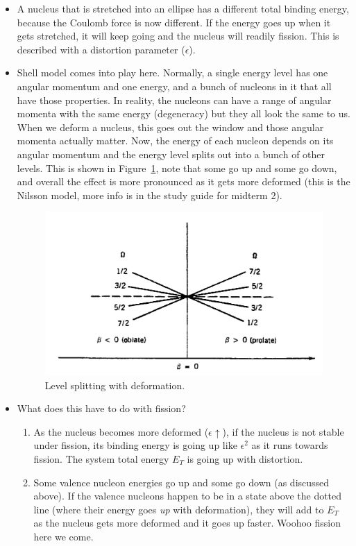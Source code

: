 \documentclass[letter]{article}
\begin{document}
\begin{itemize}
\item A nucleus that is stretched into an ellipse has a different
  total binding energy, because the Coulomb force is now different. If
  the energy goes up when it gets stretched, it will keep going and the
  nucleus will readily fission. This is described with a distortion
  parameter ($\epsilon$). ~\cite[pp. 494]{krane}
\item Shell model comes into play here. Normally, a single energy
  level has one angular momentum and one energy, and a bunch of nucleons
  in it that all have those properties. In reality, the nucleons can
  have a range of angular momenta with the same energy (degeneracy)
  but they all look the same to us. When we deform a nucleus, this
  goes out the window and those
  angular momenta actually matter. Now, the energy of each nucleon
  depends on its angular momentum and the energy level splits out into
  a bunch of other levels. This is shown
  in Figure~\ref{fig:levelsplit}, note that some go up and some go
  down, and overall the effect is more pronounced as it gets more
  deformed (this is the Nilsson model, more info is in the study
  guide for midterm 2).~\cite[pp. 151-153]{lecture}

  \begin{figure}[hbtp]
    \centering
    \includegraphics[scale=0.5]{images/levelsplit.png}
    \caption{Level splitting with deformation.~\cite[pg. 153]{krane}}
    \label{fig:levelsplit}
  \end{figure}
\item What does this have to do with fission? 
  \begin{enumerate}
  \item As the nucleus becomes more deformed ($\epsilon\uparrow$), if
    the nucleus is not stable under fission, its binding
    energy is going up like $\epsilon^2$ as it runs towards
    fission. The system total energy $E_T$ is going up with
    distortion. 
  \item Some valence nucleon energies go up and some go down (as discussed
    above). If the valence nucleons happen to be in a state above the
    dotted line (where their energy goes \textit{up} with
    deformation), they will add to $E_T$ as the nucleus gets more
    deformed and it goes up faster. Woohoo fission here we come.


\end{enumerate}
\end{itemize}
\end{document}
